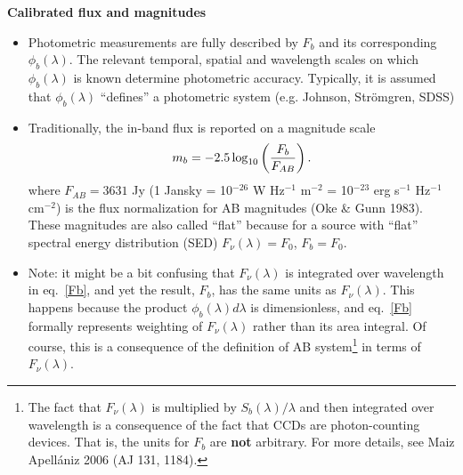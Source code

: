 \documentclass[letterpaper,landscape]{slides}
\begin{document}
\begin{slide}
\begin{center}
\bfseries
{\large {\color{red} Calibrated flux and magnitudes}}
\end{center}
\vskip 0.6in

\begin{itemize}
\item
Photometric measurements are fully described by $F_b$ and its corresponding 
$\phi_b(\lambda)$. The relevant temporal, spatial and wavelength scales 
on which $\phi_b(\lambda)$ is known determine photometric accuracy.
Typically, it is assumed that $\phi_b(\lambda)$ ``defines'' a photometric
system (e.g. Johnson, Str\"omgren, SDSS)
\item
Traditionally, the in-band flux is reported on a magnitude scale
\begin{equation}
\label{ABmag}
                m_b = -2.5\log_{10}\left({F_b \over F_{AB} }\right).
\end{equation}
where $F_{AB} = 3631$ Jy (1 Jansky = 10$^{-26}$ W Hz$^{-1}$ m$^{-2}$ 
= 10$^{-23}$ erg s$^{-1}$ Hz$^{-1}$ cm$^{-2}$) is the flux normalization 
for AB magnitudes (Oke \& Gunn 1983). These magnitudes are also called 
``flat'' because for a source with ``flat'' spectral energy distribution 
(SED) $F_\nu(\lambda)= F_0$, $F_b = F_0$. 
\item
Note: it might be a bit confusing that $F_\nu(\lambda)$ is integrated over
wavelength in eq.~\ref{Fb}, and yet the result, $F_b$, has the same
units as $F_\nu(\lambda)$. This happens because the product 
$\phi_b(\lambda) d\lambda$ is dimensionless, and eq.~\ref{Fb} 
formally represents weighting of $F_\nu(\lambda)$ rather than 
its area integral. Of course, this is a consequence of the definition
of AB system\footnote{The fact that $F_\nu(\lambda)$ is multiplied by 
$S_b(\lambda)/\lambda$ and then integrated over wavelength is a 
consequence of the fact that CCDs are photon-counting devices. That is,
the units for $F_b$ are {\bf not} arbitrary. For more details, see 
Maiz Apell\'{a}niz 2006 (AJ 131, 1184).} 
in terms of $F_\nu(\lambda)$.  
\end{itemize} 

\end{slide}
 

\end{document}
